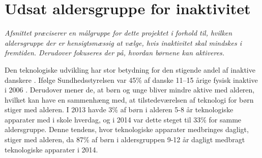 \section {Udsat aldersgruppe for inaktivitet} \label{sec:maalgruppe}
\textit{Afsnittet præciserer en målgruppe for dette projektet i forhold til, hvilken aldersgruppe der er hensigtsmæssig at vælge, hvis inaktivitet skal mindskes i fremtiden. Derudover fokuseres der på, hvordan børnene kan aktiveres.}

Den teknologiske udvikling har stor betydning for den stigende andel af inaktive danskere %
\citep{Kiens2007}. Ifølge Sundhedsstyrelsen var 45\% af danske 11–15 årige fysisk inaktive i 2006 \citep{Sundhedsstyrelsen2006}. Derudover mener de, at børn og unge bliver mindre aktive med alderen, hvilket kan have en sammenhæng med, at tilstedeværelsen af teknologi for børn stiger med alderen. %
I 2013 havde 3\% af børn i alderen 5-8 år teknologiske apparater med i skole hverdag, og i 2014 var dette steget til 33\% for samme aldersgruppe. Denne tendens, hvor teknologiske apparater medbringes dagligt, stiger med alderen, da 87\% af børn i aldersgruppen 9-12 år dagligt medbragt teknologiske apparater i 2014. \citep{Sundhedsstyrelsen2006,GjensidigeForsikring2014}

